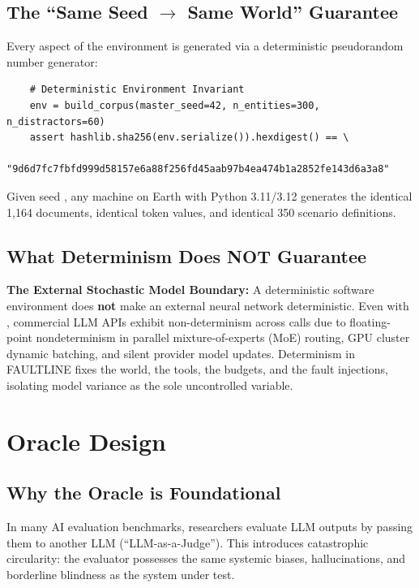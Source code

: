 \subsection{The ``Same Seed $\to$ Same World'' Guarantee}
Every aspect of the environment is generated via a deterministic pseudorandom number generator:
\begin{verbatim}
    # Deterministic Environment Invariant
    env = build_corpus(master_seed=42, n_entities=300, n_distractors=60)
    assert hashlib.sha256(env.serialize()).hexdigest() == \
        "9d6d7fc7fbfd999d58157e6a88f256fd45aab97b4ea474b1a2852fe143d6a3a8"
\end{verbatim}
Given seed , any machine on Earth with Python 3.11/3.12 generates the identical 1,164 documents, identical token values, and identical 350 scenario definitions.

\subsection{What Determinism Does NOT Guarantee}
\begin{dangerbox}
\textbf{The External Stochastic Model Boundary:} A deterministic software environment does \textbf{not} make an external neural network deterministic. Even with , commercial LLM APIs exhibit non-determinism across calls due to floating-point nondeterminism in parallel mixture-of-experts (MoE) routing, GPU cluster dynamic batching, and silent provider model updates. Determinism in FAULTLINE fixes the world, the tools, the budgets, and the fault injections, isolating model variance as the sole uncontrolled variable.
\end{dangerbox}

\vspace{12pt}
\section{Oracle Design}

\subsection{Why the Oracle is Foundational}
In many AI evaluation benchmarks, researchers evaluate LLM outputs by passing them to another LLM (``LLM-as-a-Judge''). This introduces catastrophic circularity: the evaluator possesses the same systemic biases, hallucinations, and borderline blindness as the system under test.

